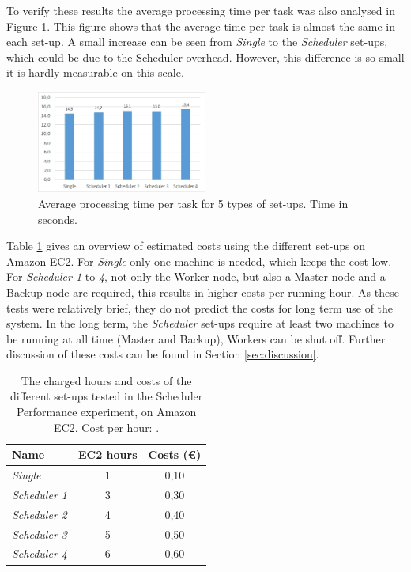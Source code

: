 \documentclass{acm_proc_article-sp}
\begin{document}
To verify these results the average processing time per task was also analysed in Figure \ref{fig:diagram_avg_image}.
This figure shows that the average time per task is almost the same in each set-up.
A small increase can be seen from \emph{Single} to the \emph{Scheduler} set-ups, which could be due to the Scheduler overhead.
However, this difference is so small it is hardly measurable on this scale.

\begin{figure}
	\centering
	\includegraphics[width=0.5\textwidth]{images/diagram_avg_image.jpg}
	\caption{Average processing time per task for 5 types of set-ups. Time in seconds.}
	\label{fig:diagram_avg_image}
\end{figure}

Table \ref{tbl:costs} gives an overview of estimated costs using the different set-ups on Amazon EC2.
For \emph{Single} only one machine is needed, which keeps the cost low.
For \emph{Scheduler 1} to \emph{4}, not only the Worker node, but also a Master node and a Backup node are required, this results in higher costs per running hour.
As these tests were relatively brief, they do not predict the costs for long term use of the system.
In the long term, the \emph{Scheduler} set-ups require at least two machines to be running at all time (Master and Backup), Workers can be shut off.
Further discussion of these costs can be found in Section \ref{sec:discussion}.

\begin{table}
	\centering
	\begin{tabular}{| l | c | c |}
		\hline
		Name & EC2 hours & Costs (\euro) \\ \hline \hline
		\emph{Single} & 1 & 0,10 \\ \hline
		\emph{Scheduler 1} & 3 & 0,30 \\ \hline
		\emph{Scheduler 2} & 4 & 0,40 \\ \hline
		\emph{Scheduler 3} & 5 & 0,50 \\ \hline
		\emph{Scheduler 4} & 6 & 0,60 \\ \hline
	\end{tabular}
	\caption{The charged hours and costs of the different set-ups tested in the Scheduler Performance experiment, on Amazon EC2. Cost per hour: .}
	\label{tbl:costs}
\end{table}
\end{document}
